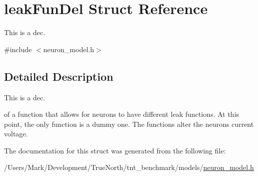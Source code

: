 \hypertarget{structleak_fun_del}{}\section{leak\+Fun\+Del Struct Reference}
\label{structleak_fun_del}


This is a dec.  




{\ttfamily \#include $<$neuron\+\_\+model.\+h$>$}



\subsection{Detailed Description}
This is a dec. 

of a function that allows for neurons to have different leak functions. At this point, the only function is a dummy one. The functions alter the neuron\textquotesingle{}s current voltage. 

The documentation for this struct was generated from the following file\+:\begin{DoxyCompactItemize}
\item 
/\+Users/\+Mark/\+Development/\+True\+North/tnt\+\_\+benchmark/models/\hyperlink{neuron__model_8h}{neuron\+\_\+model.\+h}\end{DoxyCompactItemize}
